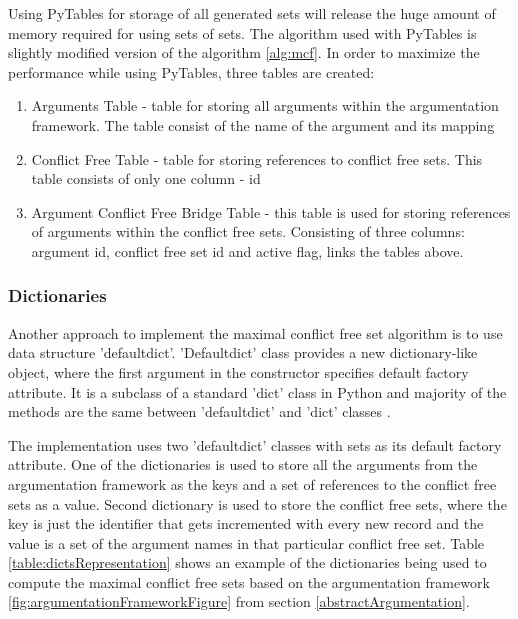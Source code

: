 Using PyTables for storage of all generated sets will release the huge amount of memory required for using sets of sets. The algorithm used with PyTables is slightly modified version of the algorithm \ref{alg:mcf}. In order to maximize the performance while using PyTables, three tables are created:
\begin{enumerate}
	\item{Arguments Table - table for storing all arguments within the argumentation framework. The table consist of the name of the argument and its mapping}
	\item{Conflict Free Table - table for storing references to conflict free sets. This table consists of only one column - id}
	\item{Argument Conflict Free Bridge Table - this table is used for storing references of arguments within the conflict free sets. Consisting of three columns: argument id, conflict free set id and active flag, links the tables above.}
\end{enumerate}


\subsubsection{Dictionaries}
Another approach to implement the maximal conflict free set algorithm is to use data structure 'defaultdict'. 'Defaultdict' class provides a new dictionary-like object, where the first argument in the constructor specifies default factory attribute. It is a subclass of a standard 'dict' class in Python and majority of the methods are the same between 'defaultdict' and 'dict' classes \citep{defaultdict}.

The implementation uses two 'defaultdict' classes with sets as its default factory attribute. One of the dictionaries is used to store all the arguments from the argumentation framework as the keys and a set of references to the conflict free sets as a value. Second dictionary is used to store the conflict free sets, where the key is just the identifier that gets incremented with every new record and the value is a set of the argument names in that particular conflict free set. Table \ref{table:dictsRepresentation} shows an example of the dictionaries being used to compute the maximal conflict free sets based on the argumentation framework \ref{fig:argumentationFrameworkFigure} from section \ref{abstractArgumentation}.

